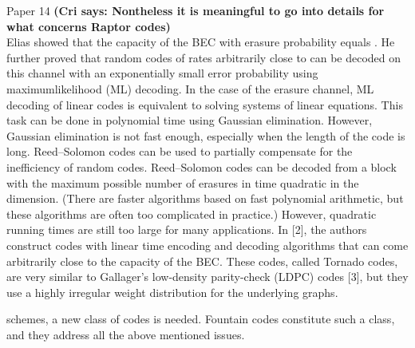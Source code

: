 \documentclass[12pt,a4paper,titlepage,twocolumn]{article}
\newcommand{\cri}[1]{\textcolor{MyColor2}{\textbf{(Cri says: #1)}}}
\begin{document}
Paper 14
\cri{Nontheless it is meaningful to go into details for what concerns Raptor codes}\\
Elias showed that the capacity of the BEC with erasure probability
equals . He further proved that random codes of
rates arbitrarily close to can be decoded on this channel
with an exponentially small error probability using maximumlikelihood
(ML) decoding. In the case of the erasure channel,
ML decoding of linear codes is equivalent to solving systems
of linear equations. This task can be done in polynomial time
using Gaussian elimination. However, Gaussian elimination is
not fast enough, especially when the length of the code is long.
Reed–Solomon codes can be used to partially compensate
for the inefficiency of random codes. Reed–Solomon codes can
be decoded from a block with the maximum possible number
of erasures in time quadratic in the dimension. (There are
faster algorithms based on fast polynomial arithmetic, but these
algorithms are often too complicated in practice.) However,
quadratic running times are still too large for many applications.
In [2], the authors construct codes with linear time encoding
and decoding algorithms that can come arbitrarily close to the
capacity of the BEC. These codes, called Tornado codes, are
very similar to Gallager’s low-density parity-check (LDPC)
codes [3], but they use a highly irregular weight distribution for
the underlying graphs.

schemes, a new class of codes is needed. Fountain codes
constitute such a class, and they address all the above mentioned
issues.
\end{document}
